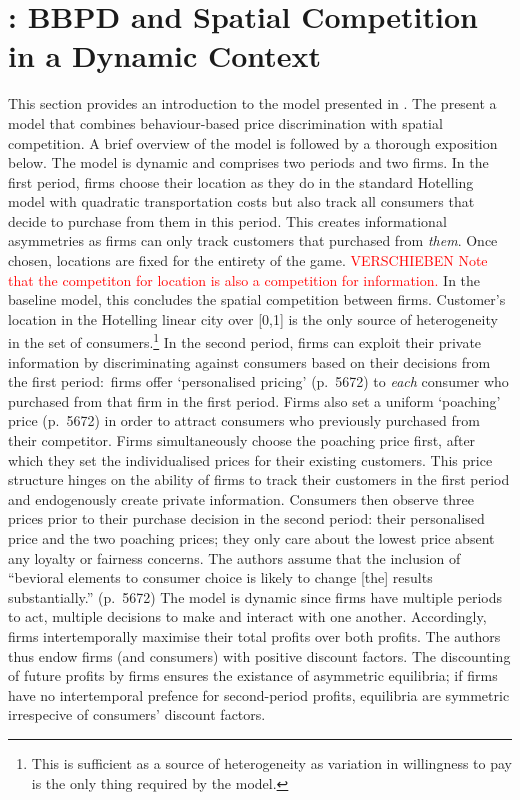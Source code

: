 \documentclass[a4paper, 11 pt, fleqn]{article}
\begin{document}
\section{\citet{Choe.2018}: BBPD and Spatial Competition in a Dynamic Context} \label{sec:choe_2018_intro}
%
This section provides an introduction to the model presented in \citet{Choe.2018}. The present a model that combines
behaviour-based price discrimination with spatial competition. A brief overview of the model is followed by a thorough
exposition below. The model is dynamic and comprises two periods and two firms.
In the first period, firms choose their location as they do in the standard Hotelling model with quadratic transportation costs
but also track all consumers that decide to purchase from them in this period. This creates informational asymmetries as
firms can only track customers that purchased from \textit{them}. Once chosen, locations are fixed for the entirety of the
game. \textcolor{red}{VERSCHIEBEN Note that the competiton for location is also a competition for information.} In the baseline model, this concludes the spatial competition between firms. Customer's location in the Hotelling linear
city over [0,1] is the only source of heterogeneity in the set of consumers.\footnote{This is sufficient as a source of heterogeneity as variation in willingness to pay is the only thing required by the model.} In the second period, firms can exploit
their private information by discriminating against consumers based on their decisions from the first period:~firms offer
`personalised pricing' (p.~5672) to \textit{each} consumer who purchased from that firm in the first period. Firms also set
a uniform `poaching' price (p.~5672) in order to attract consumers who previously purchased from their competitor.
Firms simultaneously choose the poaching price first, after which they set the individualised prices for their existing customers.
This price structure hinges on the ability of firms to track their customers in the first period and endogenously create private
information. Consumers then observe three prices prior to their purchase decision in the second period: their personalised price
and the two poaching prices; they only care about the lowest price absent any loyalty or fairness concerns. The authors assume that
the inclusion of ``bevioral elements to consumer choice is likely to change [the] results substantially.'' (p.~5672)
The model is dynamic since firms have multiple periods to act, multiple decisions to make and interact with one another.
Accordingly, firms intertemporally maximise their total profits over both profits. The authors thus endow firms (and consumers) with
positive discount factors. The discounting of future profits by firms ensures the existance of asymmetric equilibria; if firms have no
intertemporal prefence for second-period profits, equilibria are symmetric irrespecive of consumers' discount factors.
\end{document}
